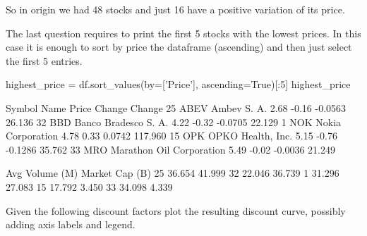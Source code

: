 So in origin we had 48 stocks and just 16 have a positive variation of its price.

The last question requires to print the first 5 stocks with the lowest prices. In this case it is enough to sort by price the dataframe (ascending) and then just select the first 5 entries.

\begin{ipython}
highest_price = df.sort_values(by=['Price'], ascending=True)[:5]
highest_price

   Symbol                      Name  Price  Change  Change%
25   ABEV               Ambev S. A.   2.68   -0.16  -0.0563      26.136
32    BBD      Banco Bradesco S. A.   4.22   -0.32  -0.0705      22.129
1     NOK         Nokia Corporation   4.78    0.33   0.0742     117.960
15    OPK         OPKO Health, Inc.   5.15   -0.76  -0.1286      35.762
33    MRO  Marathon Oil Corporation   5.49   -0.02  -0.0036      21.249

    Avg Volume (M)  Market Cap (B)
25          36.654          41.999
32          22.046          36.739
1           31.296          27.083
15          17.792           3.450
33          34.098           4.339
\end{ipython}


\begin{question}
Given the following discount factors plot the resulting discount curve,
possibly adding axis labels and legend.
\end{question}

